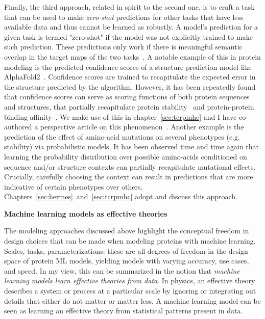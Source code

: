 Finally, the third approach, related in spirit to the second one, is to craft a task that can be used to make \textit{zero-shot} predictions for other tasks that
have less available data and thus cannot be learned as robustly.
A model's prediction for a given task is termed "zero-shot" if the model was not explicitly trained to make such prediction.
These predictions only work if there is meaningful semantic overlap in the target maps of the two tasks~\citep{larochelle_zero-data_2008, palatucci_zero-shot_2009}.
A notable example of this in protein modeling is the predicted confidence scores of a structure prediction model like AlphaFold2~\citep{jumper_highly_2021}.
Confidence scores are trained to recapitulate the expected error in the structure predicted by the algorithm. However, it has been repeatedly found
that confidence scores can serve as scoring functions of both protein sequences and structures, that partially recapitulate protein stability~\citep{roney_state---art_2022}
and protein-protein binding affinity~\citep{Bradley2023-rl}. We make use of this in chapter~\ref{sec:tcrpmhc} and I have co-authored a perspective article on this
phenomenon~\citep{nourmohammad_machine-learning_2022}.
Another example is the prediction of the effect of amino-acid mutations on several phenotypes (e.g. stability) via probabilistic models.
It has been observed time and time again that learning the probability distribution over possible amino-acids conditioned on sequence and/or structure contexts
can partially recapitulate mutational effects. Crucially, carefully choosing the context can result in predictions that are more indicative of certain phenotypes over others.
Chapters~\ref{sec:hermes}~and~\ref{sec:tcrpmhc} adopt and discuss this approach.



\textbf{Machine learning models as effective theories}

The modeling approaches discussed above highlight the conceptual freedom in design choices that can be made when modeling proteins with machine learning.
Scales, tasks, parameterizations: these are all degrees of freedom in the design space of protein ML models, yielding models with varying accuracy, use cases, and speed.
In my view, this can be summarized in the notion that \textit{machine learning models learn effective theories from data}.
In physics, an effective theory describes a system or process at a particular scale by ignoring or integrating out details that either do not matter or matter less.
A machine learning model can be seen as learning an effective theory from statistical patterns present in data.

